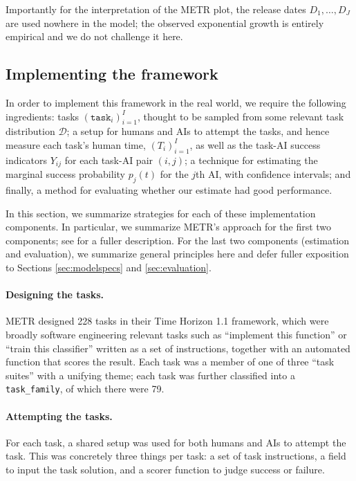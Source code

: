 \documentclass{article}
\theoremstyle{definition}
\newcommand{\task}{\texttt{task}}
\begin{document}
Importantly for the interpretation of the METR plot, the release dates $D_1, \dots, D_J$ are used nowhere in the model; the observed exponential growth is entirely empirical and we do not challenge it here. 

\subsection{Implementing the framework}\label{sec:implementation}

In order to implement this framework in the real world, we require the following ingredients: tasks $(\task_i)_{i = 1}^I$, thought to be sampled from some relevant task distribution $\mathcal{D}$; a setup for humans and AIs to attempt the tasks, and hence measure each task's human time, $(T_i)_{i=1}^I$, as well as the task-AI success indicators $Y_{ij}$ for each task-AI pair $(i,j)$; a technique for estimating the marginal success probability $p_j(t)$ for the $j$th AI, with confidence intervals; and finally, a method for evaluating whether our estimate had good performance. 

In this section, we summarize strategies for each of these implementation components. In particular, we summarize METR's approach for the first two components; see \citet{kwaMeasuringAIAbility2025a} for a fuller description. For the last two components (estimation and evaluation), we summarize general principles here and defer fuller exposition to Sections \ref{sec:modelspecs} and \ref{sec:evaluation}. 


\paragraph{Designing the tasks.} METR designed 228 tasks in their Time Horizon 1.1 framework, which were broadly software engineering relevant tasks such as ``implement this function'' or ``train this classifier'' written as a set of instructions, together with an automated function that scores the result. Each task was a member of one of three ``task suites'' with a unifying theme; each task was further classified into a \texttt{task\_family}, of which there were 79. 

\paragraph{Attempting the tasks.} For each task, a shared setup was used for both humans and AIs to attempt the task. This was concretely three things per task: a set of task instructions, a field to input the task solution, and a scorer function to judge success or failure. 
\end{document}
